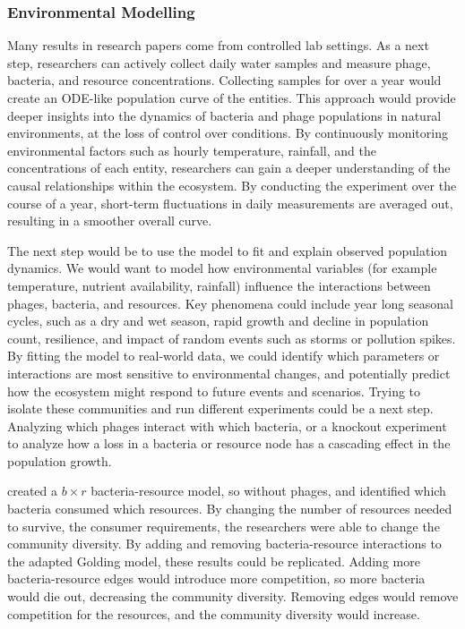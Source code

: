 \subsubsection{Environmental Modelling}
Many results in research papers come from controlled lab settings. 
As a next step, researchers can actively collect daily water samples and measure phage, bacteria, and resource concentrations. 
Collecting samples for over a year would create an ODE-like population curve of the entities. 
This approach would provide deeper insights into the dynamics of bacteria and phage populations in natural environments, at the loss of control over conditions. 
By continuously monitoring environmental factors such as hourly temperature, rainfall, and the concentrations of each entity, researchers can gain a deeper understanding of the causal relationships within the ecosystem.
By conducting the experiment over the course of a year, short-term fluctuations in daily measurements are averaged out, resulting in a smoother overall curve.

The next step would be to use the model to fit and explain observed population dynamics. 
We would want to model how environmental variables (for example temperature, nutrient availability, rainfall) influence the interactions between phages, bacteria, and resources. 
Key phenomena could include year long seasonal cycles, such as a dry and wet season, rapid growth and decline in population count, resilience, and impact of random events such as storms or pollution spikes. 
By fitting the model to real-world data, we could identify which parameters or interactions are most sensitive to environmental changes, and potentially predict how the ecosystem might respond to future events and scenarios. 
Trying to isolate these communities and run different experiments could be a next step. 
Analyzing which phages interact with which bacteria, or a knockout experiment to analyze how a loss in a bacteria or resource node has a cascading effect in the population growth. 

\citet{cleggCrossfeedingCreatesTipping2025} created a $b\times r$ bacteria-resource model, so without phages, and identified which bacteria consumed which resources. 
By changing the number of resources needed to survive, the consumer requirements, the researchers were able to change the community diversity. 
By adding and removing bacteria-resource interactions to the adapted Golding model, these results could be replicated. 
Adding more bacteria-resource edges would introduce more competition, so more bacteria would die out, decreasing the community diversity. 
Removing edges would remove competition for the resources, and the community diversity would increase. 

